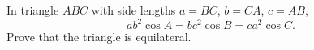 In triangle $ABC$ with side lengths $a=BC$, $b=CA$, $c=AB$,
\[ab^2\cos A=bc^2\cos B=ca^2\cos C .\]
Prove that the triangle is equilateral.
